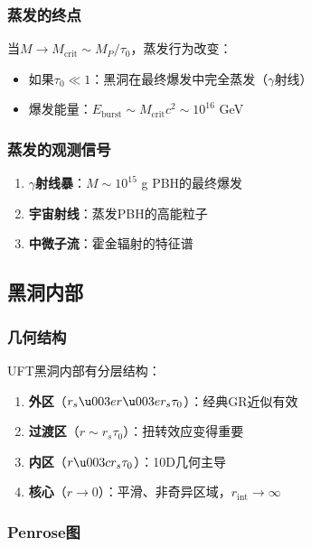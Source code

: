 \subsubsection{蒸发的终点}

\begin{theorem}[黑洞终点是遗迹或爆发]
当$M \to M_{\text{crit}} \sim M_P/\tau_0$，蒸发行为改变：
\begin{itemize}
    \item 如果$\tau_0 \ll 1$：黑洞在最终爆发中完全蒸发（$\gamma$射线）
    \item 爆发能量：$E_{\text{burst}} \sim M_{\text{crit}} c^2 \sim 10^{16}$ GeV
\end{itemize}
\end{theorem}

\subsubsection{蒸发的观测信号}

\begin{enumerate}
    \item \textbf{$\gamma$射线暴}：$M \sim 10^{15}$ g PBH的最终爆发
    \item \textbf{宇宙射线}：蒸发PBH的高能粒子
    \item \textbf{中微子流}：霍金辐射的特征谱
\end{enumerate}

\subsection{黑洞内部}

\subsubsection{几何结构}

UFT黑洞内部有分层结构：

\begin{enumerate}
    \item \textbf{外区}（$r_s \u003e r \u003e r_s\tau_0$）：经典GR近似有效
    \item \textbf{过渡区}（$r \sim r_s\tau_0$）：扭转效应变得重要
    \item \textbf{内区}（$r \u003c r_s\tau_0$）：10D几何主导
    \item \textbf{核心}（$r \to 0$）：平滑、非奇异区域，$r_{\text{int}} \to \infty$
\end{enumerate}

\subsubsection{Penrose图}

